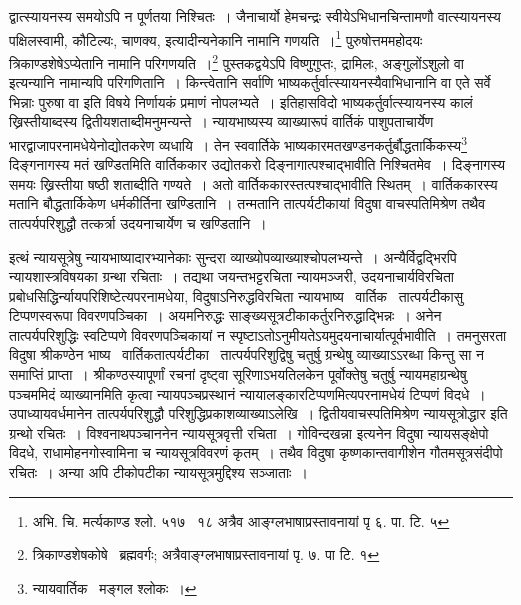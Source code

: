 \documentclass[11pt, openany]{book}
\begin{document}
\newpage
\begin{sloppypar}
\noindent
द्वात्स्यायनस्य समयोऽपि न पूर्णतया निश्चितः~। जैनाचार्यो {\knu हेमचन्द्रः} स्वीयेऽ{\knu भिधानचिन्तामणौ} वात्स्यायनस्य पक्षिलस्वामी, कौटिल्यः, चाणक्य, इत्यादीन्यनेकानि नामानि गणयति~।\renewcommand{\thefootnote}{१६}\footnote{अभि. चि. मर्त्यकाण्ड श्लो. ५१७  \textendash\ १८ अत्रैव आङ्ग्लभाषाप्रस्तावनायां पृ ६. पा. टि. ५} पुरुषोत्तममहोदयः त्रिकाण्डशेषेऽप्येतानि नामानि परिगणयति~।\renewcommand{\thefootnote}{१७}\footnote{त्रिकाण्डशेषकोषे \textendash\ ब्रह्मवर्गः; अत्रैवाङ्ग्लभाषाप्रस्तावनायां पृ. ७. पा टि. १} पुस्तकद्वयेऽपि विष्णुगुप्तः, द्रामिलः, अङ्गुलोंऽशुलो वा इत्यन्यानि नामान्यपि परिगणितानि~। किन्त्वेतानि सर्वाणि भाष्यकर्तुर्वात्स्यायनस्यैवाभिधानानि वा एते सर्वे भिन्नाः पुरुषा वा इति विषये निर्णायकं प्रमाणं नोपलभ्यते~। इतिहासविदो भाष्यकर्तुर्वात्स्यायनस्य कालं ख्रिस्तीयाब्दस्य द्वितीयशताब्दीमनुमन्यन्ते~। न्यायभाष्यस्य व्याख्यारूपं वार्तिकं पाशुपताचार्येण भारद्वाजापरनामधेयेनोद्योतकरेण व्यधायि~। तेन स्ववार्तिके भाष्यकारमतखण्डनकर्तुर्बौद्धतार्किकस्य\renewcommand{\thefootnote}{१८}\footnote{न्यायवार्तिक \textendash\ मङ्गल श्लोकः~।} {\knu दिङ्गनागस्य} मतं खण्डितमिति {\knu वार्तिककार उद्योतकरो} दिङ्नागात्पश्चाद्भावीति निश्चितमेव~। दिङ्नागस्य समयः ख्रिस्तीया षष्ठी शताब्दीति गण्यते~। अतो वार्तिककारस्तत्पश्चाद्भावीति स्थितम्~। वार्तिककारस्य मतानि बौद्धतार्किकेण {\knu धर्मकीर्तिना} खण्डितानि~। तन्मतानि {\knu तात्पर्यटीकायां} विदुषा {\knu वाचस्पतिमिश्रेण} तथैव {\knu तात्पर्यपरिशुद्धौ} तत्कर्त्रा {\knu उदयनाचार्येण} च खण्डितानि~।
\end{sloppypar}

\begin{sloppypar}
इत्थं न्यायसूत्रेषु न्यायभाष्यादारभ्यानेकाः सुन्दरा व्याख्योपव्याख्याश्चोपलभ्यन्ते~। अन्यैर्विद्वद्भिरपि न्यायशास्त्रविषयका ग्रन्था रचिताः~। तद्यथा {\knu जयन्तभट्ट}रचिता {\knu न्यायमञ्जरी}, उदयनाचार्यविरचिता {\knu प्रबोधसिद्धिर्न्यायपरिशिष्टे}त्यपरनामधेया, विदुषाऽ{\knu निरुद्ध}विरचिता न्यायभाष्य \textendash\ वार्तिक \textendash\ तात्पर्यटीकासु टिप्पणस्वरूपा {\knu विवरणपञ्चिका}~। अयमनिरुद्धः साङ्ख्यसूत्रटीकाकर्तुरनिरुद्धाद्भिन्नः~। अनेन तात्पर्यपरिशुद्धिः स्वटिप्पणे विवरणपञ्चिकायां न स्पृष्टाऽतोऽनुमीयतेऽयमुदयनाचार्यात्पूर्वभावीति~। तमनुसरता विदुषा {\knu श्रीकण्ठेन} भाष्य \textendash\ वार्तिकतात्पर्यटीका \textendash\ तात्पर्यपरिशुद्विषु चतुर्षु ग्रन्थेषु व्याख्याऽऽरब्धा किन्तु सा न समाप्तिं प्राप्ता~। श्रीकण्ठस्यापूर्णां रचनां दृष्ट्वा सूरिणाऽ{\knu भयतिलकेन} पूर्वोक्तेषु चतुर्षु न्यायमहाग्रन्थेषु पञ्चममिदं व्याख्यानमिति कृत्वा {\knu न्यायपञ्चप्रस्थानं न्यायालङ्कारटिप्पण}मित्यपरनामधेयं टिप्पणं विदधे~। {\knu उपाध्यायवर्धमानेन} तात्पर्यपरिशुद्धौ {\knu परिशुद्धिप्रकाश}व्याख्याऽलेखि~। {\knu द्वितीयवाचस्पतिमिश्रेण न्यायसूत्रोद्धार} इति ग्रन्थो रचितः~। {\knu विश्वनाथपञ्चाननेन न्यायसूत्रवृत्ती रचि}ता~। गोविन्दखन्ना इत्यनेन विदुषा {\knu न्यायसङ्क्षेपो} विदधे, राधामोहनगोस्वामिना च {\knu न्यायसूत्रविवरणं} कृतम्~। तथैव विदुषा कृष्णकान्तवागीशेन {\knu गौतमसूत्रसंदीपो} रचितः~। अन्या अपि टीकोपटीका न्यायसूत्रमुद्दिश्य सञ्जाताः~।
\end{sloppypar}
\end{document}
